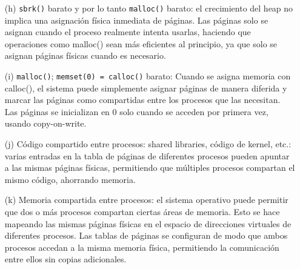 \documentclass[12pt]{article}
\begin{document}
\begin{rta}
\begin{itemize}
        \item[(h)] \texttt{sbrk()} barato y por lo tanto \texttt{malloc()} barato: el crecimiento del heap no implica una asignación física inmediata de páginas. Las páginas solo se asignan cuando el proceso realmente intenta usarlas, haciendo que operaciones como malloc() sean más eficientes al principio, ya que solo se asignan páginas físicas cuando es necesario.
        \item[(i)] \texttt{malloc()}; \texttt{memset(0) = calloc()} barato: Cuando se asigna memoria con calloc(), el sistema puede simplemente asignar páginas de manera diferida y marcar las páginas como compartidas entre los procesos que las necesitan. Las páginas se inicializan en 0 solo cuando se acceden por primera vez, usando copy-on-write.
        \item[(j)] Código compartido entre procesos: shared libraries, código de kernel, etc.: varias entradas en la tabla de páginas de diferentes procesos pueden apuntar a las mismas páginas físicas, permitiendo que múltiples procesos compartan el mismo código, ahorrando memoria.
        \item[(k)] Memoria compartida entre procesos: el sistema operativo puede permitir que dos o más procesos compartan ciertas áreas de memoria. Esto se hace mapeando las mismas páginas físicas en el espacio de direcciones virtuales de diferentes procesos. Las tablas de páginas se configuran de modo que ambos procesos accedan a la misma memoria física, permitiendo la comunicación entre ellos sin copias adicionales. 
    \end{itemize}
\end{rta}
\end{document}
